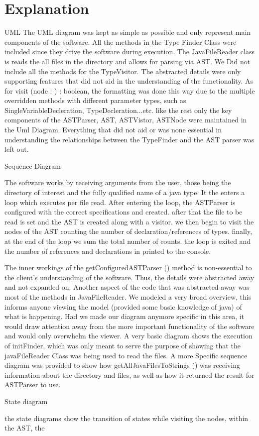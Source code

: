 \documentclass[12p]{article}
\begin{document}
\section{Explanation}

UML 
The UML diagram was kept as simple as possible and only represent main components of the software. All the methods in the Type Finder Class were included since they drive the software during execution. The JavaFileReader class is reads the all files in the directory and allows for parsing via AST. We Did not include all the methods for the TypeVisitor. The abstracted details were only supporting features that did not aid in the understanding of the functionality. As for visit (node : ) : boolean, the formatting was done this way due to the multiple overridden methods with different parameter types, such as SingleVariableDecleration, TypeDecleration...etc. 
like the rest only the key components of the ASTParser, AST, ASTVistor, ASTNode were maintained in the Uml Diagram. Everything that did not aid or was none essential in understanding the relationships between the TypeFinder and the AST parser was left out. 

Sequence Diagram

The software works by receiving arguments from the user, those being the directory of interest and the fully qualified name of a java type. It the enters a loop which executes per file read. After entering the loop, the ASTParser is configured with the correct specifications and created. after that the file to be read is set and the AST is created along with a visitor. we then begin to visit the nodes of the AST counting the number of declaration/references of types. finally, at the end of the loop we sum the total number of counts. the loop is exited and the number of references and declarations in printed to the console.  

The inner workings of the getConfiguredASTParser () method is non-essential to the client's understanding of the software. Thus, the details were abstracted away and not expanded on. Another aspect of the code that was abstracted away was most of the methods in JavaFileReader. We modeled a very broad overview, this informs anyone viewing the model (provided some basic knowledge of java) of what is happening. Had we made our diagram anymore specific in this area, it would draw attention away from the more important functionality of the software and would only overwhelm the viewer. A very basic diagram shows the execution of initFinder, which was only meant to serve the purpose of showing that the javaFileReader Class was being used to read the files. A more Specific sequence diagram was provided to show how getAllJavaFilesToStrings () was receiving information about the directory and files, as well as how it returned the result for ASTParser to use.

State diagram

the state diagrams show the transition of states while visiting the nodes, within the AST, the
\end{document}
